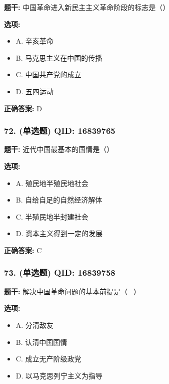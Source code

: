 \documentclass[12pt,UTF8]{ctexart}
\begin{document}
\textbf{题干:}
中国革命进入新民主主义革命阶段的标志是（）

\textbf{选项:}
\begin{itemize}[leftmargin=*]

  \item A. 辛亥革命

  \item B. 马克思主义在中国的传播

  \item C. 中国共产党的成立

  \item D. 五四运动

\end{itemize}

\textbf{正确答案:}
D

\vspace{0.3em}\hrulefill\vspace{0.7em}

\subsubsection*{72. (单选题) \small QID: 16839765}

\textbf{题干:}
近代中国最基本的国情是（）

\textbf{选项:}
\begin{itemize}[leftmargin=*]

  \item A. 殖民地半殖民地社会

  \item B. 自给自足的自然经济解体

  \item C. 半殖民地半封建社会

  \item D. 资本主义得到一定的发展

\end{itemize}

\textbf{正确答案:}
C

\vspace{0.3em}\hrulefill\vspace{0.7em}

\subsubsection*{73. (单选题) \small QID: 16839758}

\textbf{题干:}
解决中国革命问题的基本前提是（  ）

\textbf{选项:}
\begin{itemize}[leftmargin=*]

  \item A. 分清敌友

  \item B. 认清中国国情

  \item C. 成立无产阶级政党

  \item D. 以马克思列宁主义为指导

\end{itemize}
\end{document}
